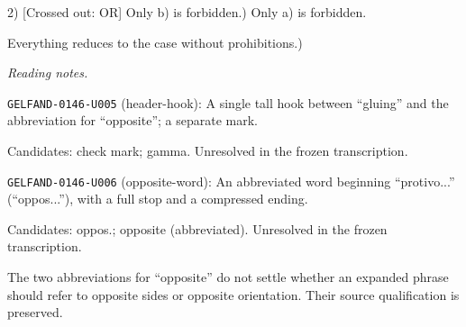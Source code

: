 2) [Crossed out: OR] Only b) is forbidden.) Only a) is forbidden.

Everything reduces to the case without prohibitions.)



\par\smallskip\noindent\textit{Reading notes.}\par
\noindent\texttt{GELFAND-0146-U005} (header-hook): A single tall hook between “gluing” and the abbreviation for “opposite”; a separate mark.\par
Candidates: check mark; gamma. Unresolved in the frozen transcription.\par
\noindent\texttt{GELFAND-0146-U006} (opposite-word): An abbreviated word beginning “protivo...” (“oppos...”), with a full stop and a compressed ending.\par
Candidates: oppos.; opposite (abbreviated). Unresolved in the frozen transcription.\par
The two abbreviations for “opposite” do not settle whether an expanded phrase should refer to opposite sides or opposite orientation. Their source qualification is preserved.\par


